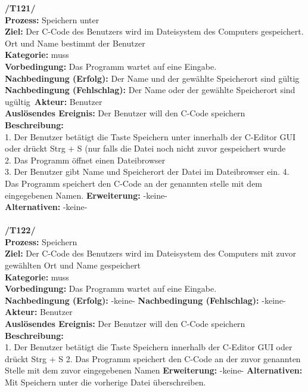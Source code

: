 \documentclass[a4paper]{scrreprt}
\begin{document}
\begin{addmargin}[15pt]{0pt}
\textbf{/T121/} \\ 
\textbf{Prozess: }Speichern unter\\
\textbf{Ziel:} Der C-Code des Benutzers wird im Dateisystem des Computers gespeichert. Ort und Name bestimmt der Benutzer\\
\textbf{Kategorie:} muss\\
\textbf{Vorbedingung:} Das Programm wartet auf eine Eingabe.\\
\textbf{Nachbedingung (Erfolg):} Der Name und der gewählte Speicherort sind gültig\\
\textbf{Nachbedingung (Fehlschlag):} Der Name oder der gewählte Speicherort sind ugültig\
\textbf{Akteur:} Benutzer\\
\textbf{Auslösendes Ereignis:} Der Benutzer will den C-Code speichern\\
\textbf{Beschreibung:} \\
1. Der Benutzer betätigt die Taste Speichern unter innerhalb der C-Editor GUI oder drückt Strg + S (nur falls die Datei noch nicht zuvor gespeichert wurde\\
2. Das Programm öffnet einen Dateibrowser\\
3. Der Benutzer gibt Name und Speicherort der Datei im Dateibrowser ein.
4. Das Programm speichert den C-Code an der genannten stelle mit dem eingegebenen Namen.
\textbf {Erweiterung:} -keine- \\
\textbf {Alternativen:} -keine- \\ \\
\textbf{/T122/} \\ 
\textbf{Prozess: }Speichern\\
\textbf{Ziel:} Der C-Code des Benutzers wird im Dateisystem des Computers mit zuvor gewählten Ort und Name gespeichert\\
\textbf{Kategorie:} muss\\
\textbf{Vorbedingung:} Das Programm wartet auf eine Eingabe.\\
\textbf{Nachbedingung (Erfolg):} -keine-
\textbf{Nachbedingung (Fehlschlag):} -keine-
\textbf{Akteur:} Benutzer\\
\textbf{Auslösendes Ereignis:} Der Benutzer will den C-Code speichern\\
\textbf{Beschreibung:} \\
1. Der Benutzer betätigt die Taste Speichern innerhalb der C-Editor GUI oder drückt Strg + S
2. Das Programm speichert den C-Code an der zuvor genannten Stelle mit dem zuvor eingegebenen Namen
\textbf {Erweiterung:} -keine-
\textbf {Alternativen:} Mit Speichern unter die vorherige Datei überschreiben. \\
\end{addmargin}
\end{document}
